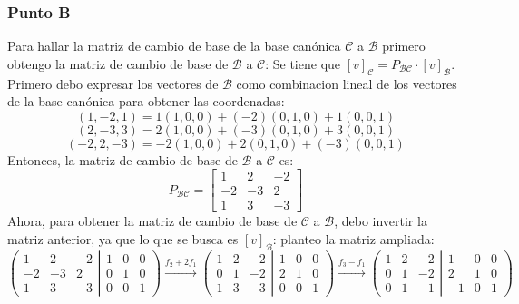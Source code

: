 \documentclass[a4paper,12pt]{article}
\begin{document}
\subsubsection{Punto B}
Para hallar la matriz de cambio de base de la base canónica $\mathcal{C}$ a $\mathcal{B}$ primero obtengo la matriz de cambio de base de $\mathcal{B}$ a $\mathcal{C}$:
Se tiene que $[v]_{\mathcal{C}} = P_{\mathcal{B} \mathcal{C}} \cdot [v]_{\mathcal{B}}$. \\
Primero debo expresar los vectores de $\mathcal{B}$ como combinacion lineal de los vectores de la base canónica para obtener las coordenadas:
$$
(1,-2,1) = 1(1,0,0)+(-2)(0,1,0)+1(0,0,1)
$$
$$
(2,-3,3) = 2(1,0,0)+(-3)(0,1,0)+3(0,0,1)
$$
$$
(-2,2,-3) = -2(1,0,0)+2(0,1,0)+(-3)(0,0,1)
$$
Entonces, la matriz de cambio de base de $\mathcal{B}$ a $\mathcal{C}$ es:
$$
P_{\mathcal{B} \mathcal{C}} = \begin{bmatrix}
    1 & 2 & -2 \\
    -2 & -3 & 2 \\
    1 & 3 & -3
\end{bmatrix}
$$
Ahora, para obtener la matriz de cambio de base de $\mathcal{C}$ a $\mathcal{B}$, debo invertir la matriz anterior, ya que lo que se busca es $[v]_{\mathcal{B}}$:
planteo la matriz ampliada:
$$
\left ( \left.\begin{matrix}
    1 & 2 & -2 \\ 
    -2 & -3 & 2 \\ 
    1 & 3 & -3
    \end{matrix}\right| \begin{matrix}
    1 & 0 & 0 \\ 
    0 & 1 & 0 \\ 
    0 & 0 & 1
    \end{matrix}\right )
\xrightarrow[]{f_2+2f_1}
\left ( \left.\begin{matrix}
    1 & 2 & -2 \\ 
    0 & 1 & -2 \\ 
    1 & 3 & -3
    \end{matrix}\right| \begin{matrix}
    1 & 0 & 0 \\ 
    2 & 1 & 0 \\ 
    0 & 0 & 1
    \end{matrix}\right )
\xrightarrow[]{f_3-f_1}
\left ( \left.\begin{matrix}
    1 & 2 & -2 \\ 
    0 & 1 & -2 \\ 
    0 & 1 & -1
    \end{matrix}\right| \begin{matrix}
    1 & 0 & 0 \\ 
    2 & 1 & 0 \\ 
    -1 & 0 & 1
    \end{matrix}\right )
$$
\end{document}
